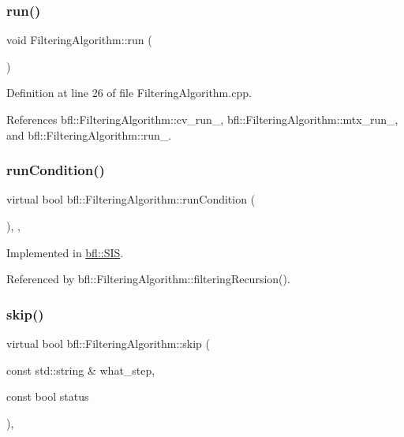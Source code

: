 \subsubsection{\texorpdfstring{run()}{run()}}
{\footnotesize\ttfamily void Filtering\+Algorithm\+::run (\begin{DoxyParamCaption}{ }\end{DoxyParamCaption})\hspace{0.3cm}{\ttfamily [inherited]}}



Definition at line 26 of file Filtering\+Algorithm.\+cpp.



References bfl\+::\+Filtering\+Algorithm\+::cv\+\_\+run\+\_\+, bfl\+::\+Filtering\+Algorithm\+::mtx\+\_\+run\+\_\+, and bfl\+::\+Filtering\+Algorithm\+::run\+\_\+.

\mbox{\label{classbfl_1_1FilteringAlgorithm_a5fc12882356f6906b102fbfff2bc4b7c}} 
\subsubsection{\texorpdfstring{run\+Condition()}{runCondition()}}
{\footnotesize\ttfamily virtual bool bfl\+::\+Filtering\+Algorithm\+::run\+Condition (\begin{DoxyParamCaption}{ }\end{DoxyParamCaption})\hspace{0.3cm}{\ttfamily [protected]}, {}, {\ttfamily [inherited]}}



Implemented in \mbox{\hyperlink{classbfl_1_1SIS_afb7cff1f7dae80e0e4ca84c925ca3ac3}{bfl\+::\+S\+IS}}.



Referenced by bfl\+::\+Filtering\+Algorithm\+::filtering\+Recursion().

\mbox{\label{classbfl_1_1FilteringAlgorithm_ac8a718a614905d89d6a43bbbc70d68b2}} 
\subsubsection{\texorpdfstring{skip()}{skip()}}
{\footnotesize\ttfamily virtual bool bfl\+::\+Filtering\+Algorithm\+::skip (\begin{DoxyParamCaption}\item[{const std\+::string \&}]{what\+\_\+step,  }\item[{const bool}]{status }\end{DoxyParamCaption})\hspace{0.3cm}{\ttfamily [pure virtual]}, {\ttfamily [inherited]}}



